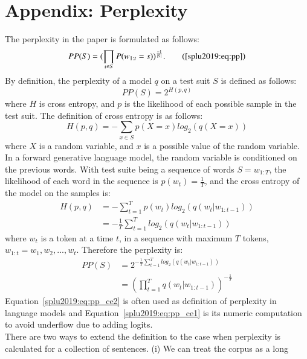 \section{Appendix: Perplexity}
\label{splu2019:sec:appendix}
The perplexity in the paper is formulated as follows:
\begin{equation}
PP(S) =  (\prod_{s \in S}{P(w_{1:t}=s)})^{\frac{-1}{|S|}}. \tag{\ref{splu2019:eq:pp}}
\end{equation}
By definition, the perplexity of a model $q$ on a test suit $S$ is defined as follows:
\begin{equation}\label{splu2019:eq:pp_ce}
PP(S) =  2^{H(p,q)}
\end{equation}
\noindent where $H$ is cross entropy, and $p$ is the likelihood of each
possible sample in the test suit. The definition of cross entropy is as follows:
\begin{equation}\label{splu2019:eq:ce}
H(p,q) = - \sum_{x \in S} p(X=x) log_2(q(X=x))
\end{equation}
\noindent where $X$ is a random variable, and $x$ is a possible value of the
random variable. In a forward generative language model, the random variable is
conditioned on the previous words. With test suite being a sequence of words
$S=w_{1:T}$, the likelihood of each word in the sequence is
$p(w_t)=\frac{1}{T}$, and the cross entropy of the model on the samples is:
\begin{align}\label{splu2019:eq:ce_lm}
H(p, q) &= - \sum_{t = 1}^{T}{p(w_t) log_2(q(w_t|w_{1:t-1}))} \\
&= -  \frac{1}{T} \sum_{t = 1}^{T}{log_2(q(w_t|w_{1:t-1}))}
\end{align}
\noindent where $w_t$ is a token at a time $t$, in a sequence with maximum $T$
tokens, $w_{1:t} = w_1, w_2, ..., w_t$.  Therefore the perplexity is:
\begin{align}
PP(S) &= 2^{- \frac{1}{T} \sum_{t = 1}^{T}{log_2(q(w_t|w_{1:t-1}))}}\label{splu2019:eq:pp_ce1} \\
&= (\prod_{t = 1}^{T}{q(w_t|w_{1:t-1})})^{- \frac{1}{T}}\label{splu2019:eq:pp_ce2}
\end{align}
\noindent Equation~\ref{splu2019:eq:pp_ce2} is often used as definition of perplexity in
language models \cite{goodman2001bit} and Equation~\ref{splu2019:eq:pp_ce1} is its
numeric computation to avoid underflow due to adding logits. \\
There are two ways to extend the definition to the case when perplexity is
calculated for a collection of sentences. (i) We can treat the corpus as a long
